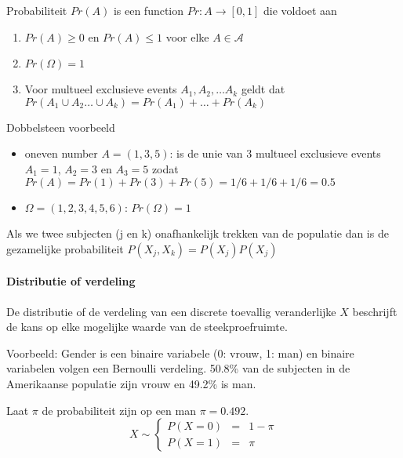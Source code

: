 \documentclass[
  12pt,dutch,coursenotes]{book}
\providecommand{\tightlist}{%
  \setlength{\itemsep}{0pt}\setlength{\parskip}{0pt}}
\theoremstyle{definition}
\theoremstyle{definition}
\theoremstyle{definition}
\theoremstyle{remark}
\begin{document}
Probabiliteit \(Pr(A)\) is een function \(Pr: A \rightarrow [0,1]\) die voldoet aan

\begin{enumerate}
\def\labelenumi{\arabic{enumi}.}
\tightlist
\item
  \(Pr(A) \geq 0\) en \(Pr(A) \leq 1\) voor elke \(A \in \mathcal{A}\)
\item
  \(Pr(\Omega)=1\)
\item
  Voor multueel exclusieve events \(A_1, A_2, \ldots A_k\) geldt dat \(Pr(A_1 \cup A_2 \ldots \cup A_k)= Pr(A_1) + \ldots + Pr(A_k)\)
\end{enumerate}

Dobbelsteen voorbeeld

\begin{itemize}
\tightlist
\item
  oneven number \(A=(1,3,5)\): is de unie van 3 multueel exclusieve events \(A_1=1\), \(A_2=3\) en \(A_3=5\) zodat
  \(Pr(A)=Pr(1)+Pr(3)+Pr(5)=1/6+1/6+1/6=0.5\)
\item
  \(\Omega=(1,2,3,4,5,6)\): \(Pr(\Omega)=1\)
\end{itemize}

Als we twee subjecten (j en k) onafhankelijk trekken van de populatie dan is de gezamelijke probabiliteit
\(P(X_j,X_k)= P(X_j)P(X_j)\)

\hypertarget{distributie-of-verdeling}{%
\paragraph{Distributie of verdeling}\label{distributie-of-verdeling}}

De distributie of de verdeling van een discrete toevallig veranderlijke \(X\) beschrijft de kans op elke mogelijke waarde van de steekproefruimte.

Voorbeeld: Gender is een binaire variabele (0: vrouw, 1: man) en binaire variabelen volgen een Bernoulli verdeling. 50.8\% van de subjecten in de Amerikaanse populatie zijn vrouw en 49.2\% is man.

Laat \(\pi\) de probabiliteit zijn op een man \(\pi=0.492\).
\[ X\sim \left \{
    \begin{array}{lcl}
    P(X=0) &=& 1-\pi\\
    P(X=1) &=& \pi
    \end{array} \right . \]
\end{document}
